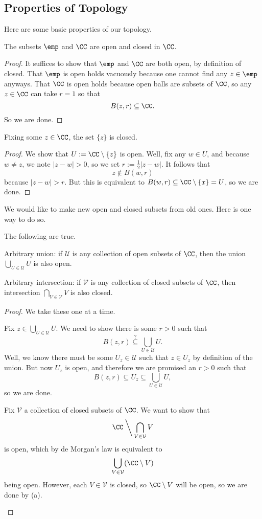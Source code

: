 \subsection{Properties of Topology}
Here are some basic properties of our topology.
\begin{lemma}
	The subsets $\emp$ and $\CC$ are open and closed in $\CC$.
\end{lemma}
\begin{proof}
	It suffices to show that $\emp$ and $\CC$ are both open, by definition of closed. That $\emp$ is open holds vacuously because one cannot find any $z\in\emp$ anyways. That $\CC$ is open holds because open balls are subsets of $\CC$, so any $z\in\CC$ can take $r=1$ so that
	\[B(z,r)\subseteq\CC.\]
	So we are done.
\end{proof}
\begin{lemma}
	Fixing some $z\in\CC$, the set $\{z\}$ is closed.
\end{lemma}
\begin{proof}
	We show that $U:=\CC\setminus\{z\}$ is open. Well, fix any $w\in U$, and because $w\ne z$, we note $|z-w|>0$, so we set $r:=\frac12|z-w|$. It follows that
	\[z\notin B(w,r)\]
	because $|z-w|>r$. But this is equivalent to $B(w,r)\subseteq\CC\setminus\{x\}=U$, so we are done.
\end{proof}
We would like to make new open and closed subsets from old ones. Here is one way to do so.
\begin{lemma} \label{lem:arbitraryunionintersection}
	The following are true.
	\begin{listalph}
		\item Arbitrary union: if $\mathcal U$ is any collection of open subsets of $\CC$, then the union $\bigcup_{U\in\mathcal U}U$ is also open.
		\item Arbitrary intersection: if $\mathcal V$ is any collection of closed subsets of $\CC$, then intersection $\bigcap_{V\in\mathcal V}V$ is also closed.
	\end{listalph}
\end{lemma}
\begin{proof}
	We take these one at a time. 
	\begin{listalph}
		\item Fix $z\in\bigcup_{U\in\mathcal U}U$. We need to show there is some $r>0$ such that
		\[B(z,r)\stackrel?\subseteq\bigcup_{U\in\mathcal U}U.\]
		Well, we know there must be some $U_z\in\mathcal U$ such that $z\in U_z$ by definition of the union. But now $U_z$ is open, and therefore we are promised an $r>0$ such that
		\[B(z,r)\subseteq U_z\subseteq\bigcup_{U\in\mathcal U}U,\]
		so we are done.
		\item Fix $\mathcal V$ a collection of closed subsets of $\CC$. We want to show that
		\[\CC\mathbin{\bigg\backslash}\bigcap_{V\in\mathcal V}V\]
		is open, which by de Morgan's law is equivalent to
		\[\bigcup_{V\in\mathcal V}(\CC\setminus V)\]
		being open. However, each $V\in\mathcal V$ is closed, so $\CC\setminus V$ will be open, so we are done by (a).
		\qedhere
	\end{listalph}
\end{proof}
